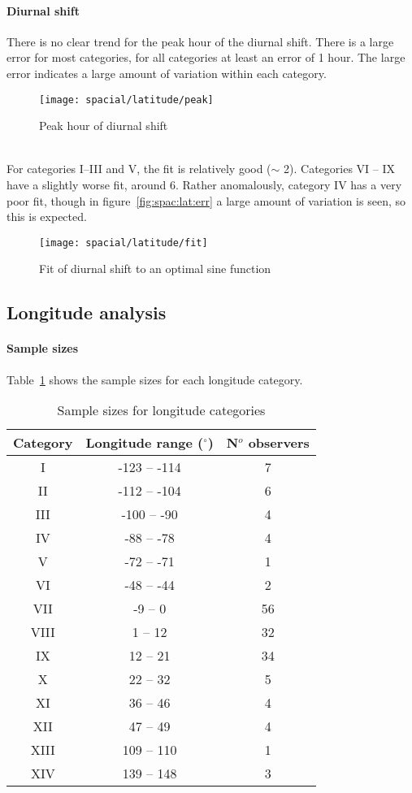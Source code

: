 \paragraph{Diurnal shift\\}
There is no clear trend for the peak hour of the diurnal shift. There is a large error for most categories, for all categories at least an error of 1 hour. The large error indicates a large amount of variation within each category.
\begin{figure}[h!]
	\centering
	\texttt{[image: spacial/latitude/peak]}
	\caption{Peak hour of diurnal shift
		\label{fig:spac:lat:peak}}
\end{figure}\\
For categories I--III and V, the fit is relatively good ($\sim$ 2). Categories VI -- IX have a slightly worse fit, around 6. Rather anomalously, category IV has a very poor fit, though in figure~\ref{fig:spac:lat:err} a large amount of variation is seen, so this is expected.
\begin{figure}[h!]
	\centering
	\texttt{[image: spacial/latitude/fit]}
	\caption{Fit of diurnal shift to an optimal sine function
		\label{fig:spac:lat:fit}}
\end{figure}

\subsection{Longitude analysis}

\paragraph{Sample sizes\\}
Table~\ref{tab:spac:long} shows the sample sizes for each longitude category.
\begin{table}[h!]
	\centering
\begin{tabular}{ccc}
	\hline 
	Category & Longitude range ($^{\circ}$) & N$^o$ observers \\ 
	\hline 
	I & -123 -- -114 & 7 \\ 
	II & -112 -- -104 & 6 \\ 
	III & -100 -- -90 & 4 \\ 
	IV & -88 -- -78 & 4 \\ 
	V & -72 -- -71 & 1 \\ 
	VI & -48 -- -44 & 2 \\ 
	VII & -9 -- 0 & 56 \\ 
	VIII & 1 -- 12 & 32 \\ 
	IX & 12 -- 21 & 34 \\ 
	X & 22 -- 32 & 5 \\ 
	XI & 36 -- 46 & 4 \\ 
	XII & 47 -- 49 & 4 \\  
	XIII & 109 -- 110 & 1 \\ 
	XIV & 139 -- 148 & 3 \\  
	\hline
\end{tabular} 
\caption{Sample sizes for longitude categories \label{tab:spac:long}}
\end{table}

